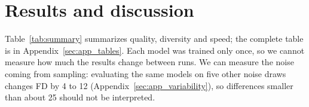 \documentclass{article}
\begin{document}
\section{Results and discussion}
\label{sec:results}

Table~\ref{tab:summary} summarizes quality, diversity and speed; the complete
table is in Appendix~\ref{sec:app_tables}. Each model was trained only once, so
we cannot measure how much the results change between runs. We can measure the
noise coming from sampling: evaluating the same models on five other noise
draws changes FD by 4 to 12 (Appendix~\ref{sec:app_variability}), so differences
smaller than about 25 should not be interpreted.

\end{document}
